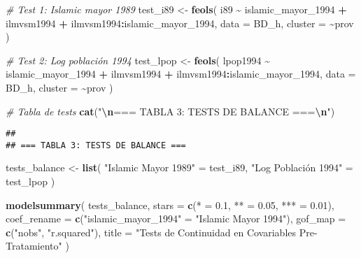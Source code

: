 \documentclass[
]{article}
\newenvironment{Shaded}{\begin{snugshade}}{\end{snugshade}}
\newcommand{\AttributeTok}[1]{\textcolor[rgb]{0.13,0.29,0.53}{#1}}
\newcommand{\CommentTok}[1]{\textcolor[rgb]{0.56,0.35,0.01}{\textit{#1}}}
\newcommand{\FloatTok}[1]{\textcolor[rgb]{0.00,0.00,0.81}{#1}}
\newcommand{\FunctionTok}[1]{\textcolor[rgb]{0.13,0.29,0.53}{\textbf{#1}}}
\newcommand{\NormalTok}[1]{#1}
\newcommand{\OtherTok}[1]{\textcolor[rgb]{0.56,0.35,0.01}{#1}}
\newcommand{\SpecialCharTok}[1]{\textcolor[rgb]{0.81,0.36,0.00}{\textbf{#1}}}
\newcommand{\StringTok}[1]{\textcolor[rgb]{0.31,0.60,0.02}{#1}}
\begin{document}
\begin{Shaded}
\begin{Highlighting}[]
\CommentTok{\# Test 1: Islamic mayor 1989}
\NormalTok{test\_i89 }\OtherTok{\textless{}{-}} \FunctionTok{feols}\NormalTok{(}
\NormalTok{  i89 }\SpecialCharTok{\textasciitilde{}}\NormalTok{ islamic\_mayor\_1994 }\SpecialCharTok{+}\NormalTok{ ilmvsm1994 }\SpecialCharTok{+}\NormalTok{ ilmvsm1994}\SpecialCharTok{:}\NormalTok{islamic\_mayor\_1994,}
  \AttributeTok{data =}\NormalTok{ BD\_h,}
  \AttributeTok{cluster =} \SpecialCharTok{\textasciitilde{}}\NormalTok{prov}
\NormalTok{)}

\CommentTok{\# Test 2: Log población 1994}
\NormalTok{test\_lpop }\OtherTok{\textless{}{-}} \FunctionTok{feols}\NormalTok{(}
\NormalTok{  lpop1994 }\SpecialCharTok{\textasciitilde{}}\NormalTok{ islamic\_mayor\_1994 }\SpecialCharTok{+}\NormalTok{ ilmvsm1994 }\SpecialCharTok{+}\NormalTok{ ilmvsm1994}\SpecialCharTok{:}\NormalTok{islamic\_mayor\_1994,}
  \AttributeTok{data =}\NormalTok{ BD\_h,}
  \AttributeTok{cluster =} \SpecialCharTok{\textasciitilde{}}\NormalTok{prov}
\NormalTok{)}

\CommentTok{\# Tabla de tests}
\FunctionTok{cat}\NormalTok{(}\StringTok{"}\SpecialCharTok{\textbackslash{}n}\StringTok{=== TABLA 3: TESTS DE BALANCE ===}\SpecialCharTok{\textbackslash{}n}\StringTok{"}\NormalTok{)}
\end{Highlighting}
\end{Shaded}

\begin{verbatim}
## 
## === TABLA 3: TESTS DE BALANCE ===
\end{verbatim}

\begin{Shaded}
\begin{Highlighting}[]
\NormalTok{tests\_balance }\OtherTok{\textless{}{-}} \FunctionTok{list}\NormalTok{(}
  \StringTok{"Islamic Mayor 1989"} \OtherTok{=}\NormalTok{ test\_i89,}
  \StringTok{"Log Población 1994"} \OtherTok{=}\NormalTok{ test\_lpop}
\NormalTok{)}

\FunctionTok{modelsummary}\NormalTok{(}
\NormalTok{  tests\_balance,}
  \AttributeTok{stars =} \FunctionTok{c}\NormalTok{(}\StringTok{\textquotesingle{}*\textquotesingle{}} \OtherTok{=} \FloatTok{0.1}\NormalTok{, }\StringTok{\textquotesingle{}**\textquotesingle{}} \OtherTok{=} \FloatTok{0.05}\NormalTok{, }\StringTok{\textquotesingle{}***\textquotesingle{}} \OtherTok{=} \FloatTok{0.01}\NormalTok{),}
  \AttributeTok{coef\_rename =} \FunctionTok{c}\NormalTok{(}\StringTok{"islamic\_mayor\_1994"} \OtherTok{=} \StringTok{"Islamic Mayor 1994"}\NormalTok{),}
  \AttributeTok{gof\_map =} \FunctionTok{c}\NormalTok{(}\StringTok{"nobs"}\NormalTok{, }\StringTok{"r.squared"}\NormalTok{),}
  \AttributeTok{title =} \StringTok{"Tests de Continuidad en Covariables Pre{-}Tratamiento"}
\NormalTok{)}
\end{Highlighting}
\end{Shaded}
\end{document}

